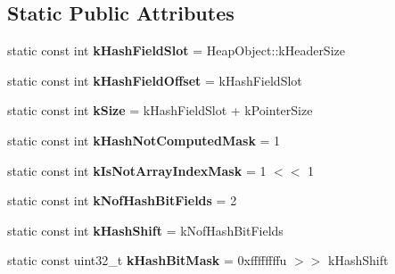 \subsection*{Static Public Attributes}
\begin{DoxyCompactItemize}
\item 
static const int {\bfseries k\+Hash\+Field\+Slot} = Heap\+Object\+::k\+Header\+Size\hypertarget{classv8_1_1internal_1_1_name_a2cfbc20f06328b7e9cbc08731ff15651}{}\label{classv8_1_1internal_1_1_name_a2cfbc20f06328b7e9cbc08731ff15651}

\item 
static const int {\bfseries k\+Hash\+Field\+Offset} = k\+Hash\+Field\+Slot\hypertarget{classv8_1_1internal_1_1_name_a6470e0e9daf944b4cd9bfff26aebb031}{}\label{classv8_1_1internal_1_1_name_a6470e0e9daf944b4cd9bfff26aebb031}

\item 
static const int {\bfseries k\+Size} = k\+Hash\+Field\+Slot + k\+Pointer\+Size\hypertarget{classv8_1_1internal_1_1_name_a5009ca3e9ba3933dd9844e6e0b3d5ed7}{}\label{classv8_1_1internal_1_1_name_a5009ca3e9ba3933dd9844e6e0b3d5ed7}

\item 
static const int {\bfseries k\+Hash\+Not\+Computed\+Mask} = 1\hypertarget{classv8_1_1internal_1_1_name_a6379c93f471c1fb21182d903fa4dff79}{}\label{classv8_1_1internal_1_1_name_a6379c93f471c1fb21182d903fa4dff79}

\item 
static const int {\bfseries k\+Is\+Not\+Array\+Index\+Mask} = 1 $<$$<$ 1\hypertarget{classv8_1_1internal_1_1_name_a9b9885f1eea305e5b9a83946791cad48}{}\label{classv8_1_1internal_1_1_name_a9b9885f1eea305e5b9a83946791cad48}

\item 
static const int {\bfseries k\+Nof\+Hash\+Bit\+Fields} = 2\hypertarget{classv8_1_1internal_1_1_name_ab0662a44175aad38e3e5665109598155}{}\label{classv8_1_1internal_1_1_name_ab0662a44175aad38e3e5665109598155}

\item 
static const int {\bfseries k\+Hash\+Shift} = k\+Nof\+Hash\+Bit\+Fields\hypertarget{classv8_1_1internal_1_1_name_a155b0b4b5fe46062d9171d2493a59e1f}{}\label{classv8_1_1internal_1_1_name_a155b0b4b5fe46062d9171d2493a59e1f}

\item 
static const uint32\+\_\+t {\bfseries k\+Hash\+Bit\+Mask} = 0xffffffffu $>$$>$ k\+Hash\+Shift\hypertarget{classv8_1_1internal_1_1_name_a9b592cfd6109e2831514bbde5d0aaea3}{}\label{classv8_1_1internal_1_1_name_a9b592cfd6109e2831514bbde5d0aaea3}


\end{DoxyCompactItemize}
